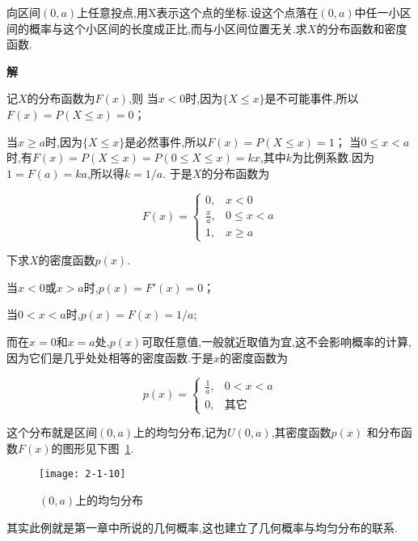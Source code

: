 \begin{example}
	向区间$ (0,a) $上任意投点,用X表示这个点的坐标.设这个点落在$ (0,a) $中任一小区间的概率与这个小区间的长度成正比,而与小区间位置无关.求$ X $的分布函数和密度函数.
	
	\textbf{解}
	
	记$ X $的分布函数为$ F(x) $,则
	当$ x<0 $时,因为$\{X \leqslant x\}$是不可能事件,所以$F(x)=P(X \leqslant x)=0$；
	
	当$x \geqslant a$时,因为$\{ X \leqslant x \}$是必然事件,所以$F(x)=P(X \leqslant x)=1$；
	当$0 \leqslant x<a$时,有$F(x)=P(X \leqslant x)=P(0 \leqslant X \leqslant x)=k x$,其中$ k $为比例系数.因为$ 1=F(a)=ka $,所以得$ k=1/a $.
	于是$ X $的分布函数为
	
	\[ 
	F(x)=\left\{\begin{array}{ll}{0,} & {x<0} \\ {\frac{x}{a},} & {0 \leqslant x<a} \\ {1,} & {x \geqslant a}\end{array}\right.
	\]
	
	
	下求$ X $的密度函数$ p(x) $.
	
	当$ x<0 $或$ x>a $时,$ p(x)=F'(x)=0 $；
	
	当$ 0<x<a $时,$ p(x)=F(x)=1/a $;
	
	而在$ x=0 $和$ x=a $处,$ p(x) $可取任意值,一般就近取值为宜,这不会影响概率的计算,因为它们是几乎处处相等的密度函数.于是$ x $的密度函数为
	
	\[ 
	p(x)=\left\{\begin{array}{ll}
	{\frac{1}{a},} & {0<x<a} \\ 
	{0,} & {\text{其它}}
	\end{array}\right.
	\]
	
	这个分布就是区间$ (0,a) $上的均匀分布,记为$ U(0,a) $,其密度函数$ p(x) $
	和分布函数$ F(x) $的图形见下图~\ref{fig:2-1-10}.
\end{example}



\begin{figure}
	\centering
	\texttt{[image: 2-1-10]}
	\caption{$ (0,a) $上的均匀分布}
	\label{fig:2-1-10}
\end{figure}

其实此例就是第一章中所说的几何概率,这也建立了几何概率与均匀分布的联系.

